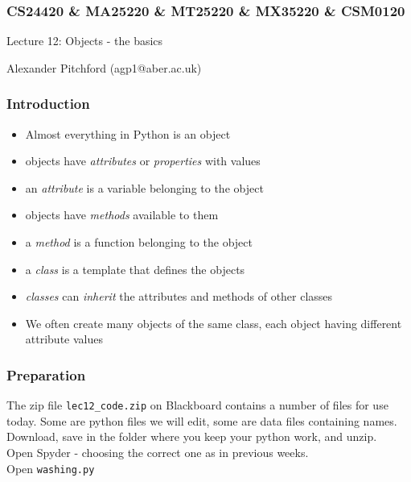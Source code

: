 \documentclass{beamer}
\begin{document}

\begin{frame}
\frametitle{CS24420 \& MA25220 \& MT25220 \& MX35220 \& CSM0120}

\begin{center}
\begin{huge}
Lecture 12: Objects - the basics 
\end{huge}
\bigskip

Alexander Pitchford (agp1@aber.ac.uk)

\end{center}
\end{frame}

\begin{frame}[fragile]
\frametitle{Introduction}
\begin{itemize}
\item Almost everything in Python is an object
\item objects have \emph{attributes} or \emph{properties} with values
\item an \emph{attribute} is a variable belonging to the object
\item objects have \emph{methods} available to them
\item a \emph{method} is a function belonging to the object
\item a \emph{class} is a template that defines the objects\\
\item \emph{classes} can \emph{inherit} the attributes and methods of other classes
\item We often create many objects of the same class, each object having different attribute values 
\end{itemize}

\end{frame}

\begin{frame}[fragile]
\frametitle{Preparation}
The zip file \texttt{lec12\_code.zip} on Blackboard contains a number of files for
use today. Some are python files we will edit, some are data files containing names.\\
\smallskip
Download, save in the folder where you keep your python work, and unzip.\\
\smallskip
Open Spyder - choosing the correct one as in previous weeks.\\
\smallskip
Open \texttt{washing.py}

\end{frame}
\end{document}
